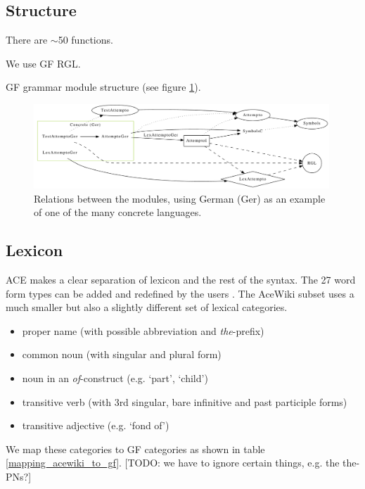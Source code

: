 \documentclass[a4paper]{article}
\begin{document}
\subsection{Structure}

There are $\sim$50 functions.

We use GF RGL.

GF grammar module structure (see figure \ref{fig:modules}).

\begin{figure}[ht]
\centering
\includegraphics[width=0.99\textwidth]{modules}
\caption[Relations between the modules]
{Relations between the modules, using German (Ger) as an example
of one of the many concrete languages.}
\label{fig:modules}
\end{figure}

\subsection{Lexicon}

ACE makes a clear separation of lexicon and the rest of the syntax.
The 27 word form types can be added and redefined by the users
\cite{ACE_6.6_Lexicon_Specification}. The AceWiki subset uses a much smaller
but also a slightly different set of lexical categories.

\begin{itemize}
\item proper name (with possible abbreviation and \emph{the}-prefix)
\item common noun (with singular and plural form)
\item noun in an \emph{of}-construct (e.g. `part', `child')
\item transitive verb (with 3rd singular, bare infinitive and past participle
forms)
\item transitive adjective (e.g. `fond of')
\end{itemize}

We map these categories to GF categories as shown in
table \ref{mapping_acewiki_to_gf}.
[TODO: we have to ignore certain things, e.g.  the the-PNs?]
\end{document}
